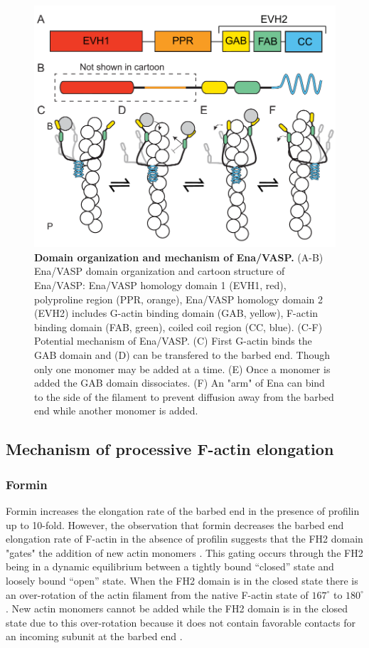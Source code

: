 \begin{figure}
\centering
\includegraphics[width=13cm]{img/ch01/Ena_mech.pdf}
\caption[Domain organization and mechanism of Ena/VASP.]{\textbf{Domain organization and mechanism of Ena/VASP.} (A-B) Ena/VASP domain organization and cartoon structure of Ena/VASP: Ena/VASP homology domain 1 (EVH1, red), polyproline region (PPR, orange), Ena/VASP homology domain 2 (EVH2) includes G-actin binding domain (GAB, yellow), F-actin binding domain (FAB, green), coiled coil region (CC, blue). (C-F) Potential mechanism of Ena/VASP. (C) First G-actin binds the GAB domain and (D) can be transfered to the barbed end. Though only one monomer may be added at a time. (E) Once a monomer is added the GAB domain dissociates. (F) An "arm" of Ena can bind to the side of the filament to prevent diffusion away from the barbed end while another monomer is added.}
\label{fig:ena-domain}
\end{figure}

\subsection{Mechanism of processive F-actin elongation}\label{ena-formin mechanism}

\subsubsection{Formin}

Formin increases the elongation rate of the barbed end in the presence of profilin up to 10-fold. However, the observation that formin decreases the barbed end elongation rate of F-actin in the absence of profilin suggests that the FH2 domain "gates" the addition of new actin monomers \citep{kovar_control_2006,otomo_structural_2005,vavylonis_model_2006}. This gating occurs through the FH2 being in a dynamic equilibrium between a tightly bound “closed” state and loosely bound “open” state. When the FH2 domain is in the closed state there is an over-rotation of the actin filament from the native F-actin state of $167^{\circ}$ to $180^{\circ}$. New actin monomers cannot be added while the FH2 domain is in the closed state due to this over-rotation because it does not contain favorable contacts for an incoming subunit at the barbed end \citep{otomo_structural_2005}.

